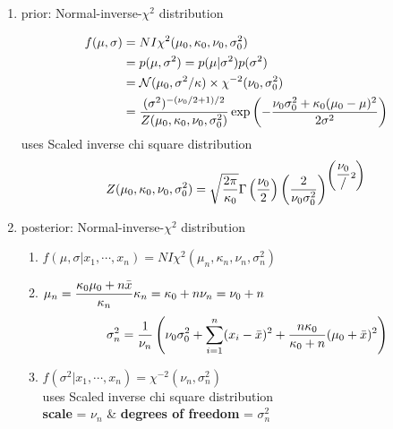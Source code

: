 \begin{enumerate}[itemsep=0.2cm]
\begin{enumerate}[itemsep=0.2cm]
        \item prior: Normal-inverse-$\chi^2$ distribution

        \renewcommand{\arraystretch}{2}
        \[
        \begin{aligned}
            f(\mu,\sigma)
            &= NI\chi^2(\mu_0, \kappa_0, \nu_0, \sigma_0^2) \\
            &= p(\mu,\sigma^2) = p(\mu|\sigma^2)p(\sigma^2)
            \\
            &= \mathcal{N}(\mu_0, \sigma^2/\kappa) \times
                \chi^{-2}(\nu_0, \sigma_0^2)\\
            &= \dfrac{
                (\sigma^2)^{-({\nu_0/2+1})/{2}}
            }{
                Z(\mu_0, \kappa_0, \nu_0, \sigma_0^2)
            } 
            \exp\left(
                -\dfrac{\nu_0\sigma_0^2 + \kappa_0(\mu_0-\mu)^2}{2\sigma^2}
            \right)
        \end{aligned}
        \]
        \renewcommand{\arraystretch}{1}
        uses Scaled inverse chi square distribution
        \[
            Z(\mu_0, \kappa_0, \nu_0, \sigma_0^2)
            = \sqrt{\dfrac{2\pi}{\kappa_0}} 
            \Gamma\left(\dfrac{\nu_0}{2}\right)
            \left(\dfrac{2}{\nu_0\sigma_0^2}\right)
            ^{\left(\dfrac{\nu_0}/{2}\right)}
        \]

        \item posterior: Normal-inverse-$\chi^2$ distribution
        \begin{enumerate}[itemsep=0.2cm]
            \item $
                f(\mu,\sigma|x_1,\cdots,x_n)
                = NI\chi^2(\mu_n, \kappa_n, \nu_n, \sigma_n^2) 
            $

            \item $
                \hfill
                \mu_n = \dfrac{\kappa_0\mu_0+n\bar{x}}{\kappa_n}
                \hfill
                \kappa_n = \kappa_0 + n
                \hfill
                \nu_n = \nu_0 + n
                \hfill
            $
            \[
                \hfill
                \sigma_n^2 = \dfrac{1}{\nu_n}
                \dParenBrac{
                    \nu_0\sigma_0^2
                    +\dsum_{i=1}^n (x_i-\bar{x})^2
                    +\dfrac{n\kappa_0}{\kappa_0 + n}
                    (\mu_0 + \bar{x})^2
                }
                \hfill
            \]

            \item $
                f(\sigma^2|x_1,\cdots,x_n) = \chi^{-2}(\nu_n, \sigma_n^2)
            $ \\[2ex]
            uses Scaled inverse chi square distribution \\
            \textbf{scale} = $\nu_n$ \& 
            \textbf{degrees of freedom} = $\sigma_n^2$


\end{enumerate}
\end{enumerate}
\end{enumerate}
